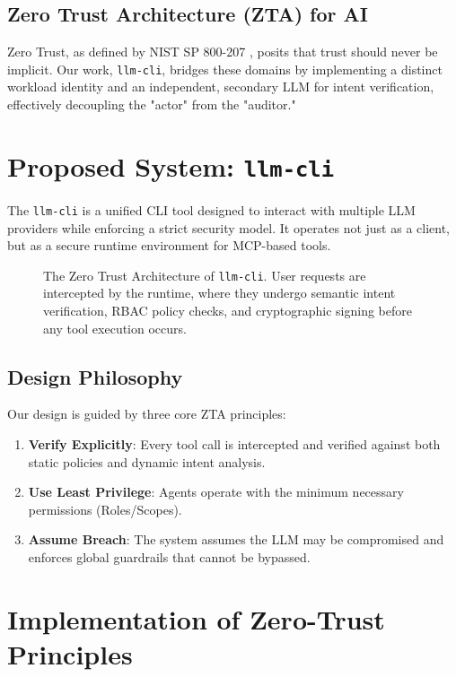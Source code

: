\documentclass[conference]{IEEEtran}
\begin{document}
\subsection{Zero Trust Architecture (ZTA) for AI}
Zero Trust, as defined by NIST SP 800-207 \cite{nist}, posits that trust should never be implicit. Our work, \texttt{llm-cli}, bridges these domains by implementing a distinct workload identity and an independent, secondary LLM for intent verification, effectively decoupling the "actor" from the "auditor."

\section{Proposed System: \texttt{llm-cli}}
The \texttt{llm-cli} is a unified CLI tool designed to interact with multiple LLM providers while enforcing a strict security model. It operates not just as a client, but as a secure runtime environment for MCP-based tools.

\begin{figure}[t!]
\centering

\caption{The Zero Trust Architecture of \texttt{llm-cli}. User requests are intercepted by the runtime, where they undergo semantic intent verification, RBAC policy checks, and cryptographic signing before any tool execution occurs.}
\label{fig:arch}
\end{figure}

\subsection{Design Philosophy}
Our design is guided by three core ZTA principles:
\begin{enumerate}
    \item \textbf{Verify Explicitly}: Every tool call is intercepted and verified against both static policies and dynamic intent analysis.
    \item \textbf{Use Least Privilege}: Agents operate with the minimum necessary permissions (Roles/Scopes).
    \item \textbf{Assume Breach}: The system assumes the LLM may be compromised and enforces global guardrails that cannot be bypassed.
\end{enumerate}

\section{Implementation of Zero-Trust Principles}
\end{document}
